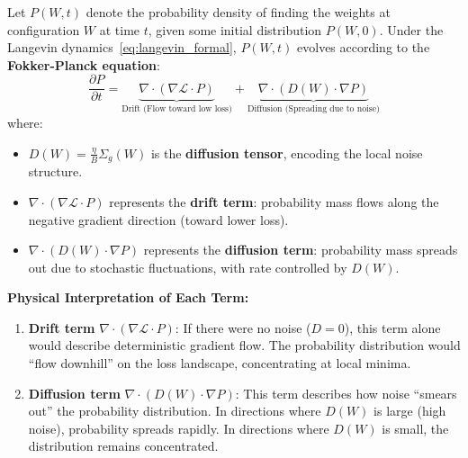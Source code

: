 \documentclass[
  journal=largetwo,
  simfonts=false,
  year=2025,
  volume=37,
]{cup-journal}
\begin{document}
\begin{definition}\label{def:fokker_planck}
Let $P(W, t)$ denote the probability density of finding the weights at configuration $W$ at time $t$, given some initial distribution $P(W, 0)$. Under the Langevin dynamics~\eqref{eq:langevin_formal}, $P(W,t)$ evolves according to the \textbf{Fokker-Planck equation}:
\begin{equation}\label{eq:fokker_planck_formal}
    \boxed{\frac{\partial P}{\partial t} = \underbrace{\nabla \cdot (\nabla \mathcal{L} \cdot P)}_{\text{Drift (Flow toward low loss)}} + \underbrace{\nabla \cdot \left( D(W) \cdot \nabla P \right)}_{\text{Diffusion (Spreading due to noise)}}}
\end{equation}
where:
\begin{itemize}
    \item $D(W) = \frac{\eta}{B} \Sigma_g(W)$ is the \textbf{diffusion tensor}, encoding the local noise structure.
    \item $\nabla \cdot (\nabla \mathcal{L} \cdot P)$ represents the \textbf{drift term}: probability mass flows along the negative gradient direction (toward lower loss).
    \item $\nabla \cdot (D(W) \cdot \nabla P)$ represents the \textbf{diffusion term}: probability mass spreads out due to stochastic fluctuations, with rate controlled by $D(W)$.
\end{itemize}
\end{definition}

\textbf{Physical Interpretation of Each Term:}
\begin{enumerate}
    \item \textbf{Drift term} $\nabla \cdot (\nabla \mathcal{L} \cdot P)$: If there were no noise ($D = 0$), this term alone would describe deterministic gradient flow. The probability distribution would ``flow downhill'' on the loss landscape, concentrating at local minima.
    
    \item \textbf{Diffusion term} $\nabla \cdot (D(W) \cdot \nabla P)$: This term describes how noise ``smears out'' the probability distribution. In directions where $D(W)$ is large (high noise), probability spreads rapidly. In directions where $D(W)$ is small, the distribution remains concentrated.
\end{enumerate}
\end{document}
